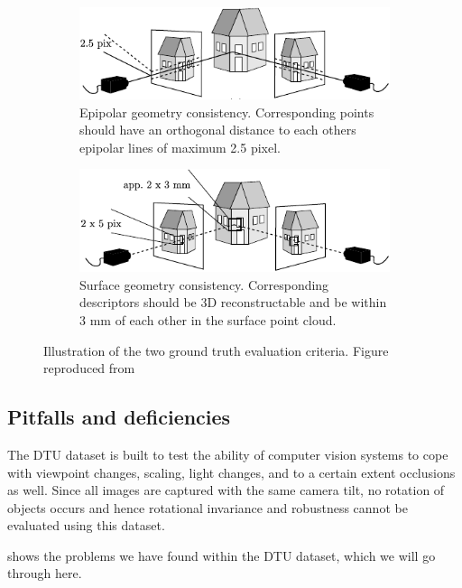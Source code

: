 \documentclass[thesis.tex]{subfiles}
\begin{document}
\begin{figure}[tb]
	\centering
	\begin{subfigure}[t]{0.8\textwidth}
		\includegraphics[width=\textwidth]{img/icEval1GT.pdf}
		\caption{Epipolar geometry consistency. Corresponding points should have an orthogonal distance to each others epipolar lines of maximum 2.5 pixel.}
		\label{fig:icEval1GT}
	\end{subfigure}
	\begin{subfigure}[t]{0.8\textwidth}
		\includegraphics[width=\textwidth]{img/icEval2GT.pdf}
		\caption{Surface geometry consistency. Corresponding descriptors should be 3D reconstructable and be within 3 mm of each other in the surface point cloud.}
		\label{fig:icEval2GT}
	\end{subfigure}
	\caption{Illustration of the two ground truth evaluation criteria. Figure reproduced from \cite[Figure 5 (a-b),pp. 4]{aanaes2010recall}}
	\label{fig:icEvalGT}
\end{figure}

%
\subsection{Pitfalls and deficiencies}
The DTU dataset is built to test the ability of computer vision systems to cope with viewpoint changes, scaling, light changes, and to a certain extent occlusions as well. Since all images are captured with the same camera tilt, no rotation of objects occurs and hence rotational invariance and robustness cannot be evaluated using this dataset.

 shows the problems we have found within the DTU dataset, which we will go through here.
\end{document}
